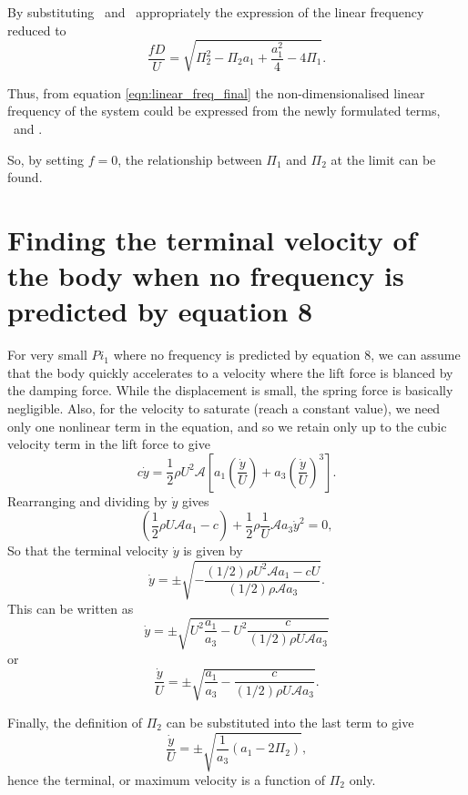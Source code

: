 By substituting \massstiff\ and \massdamp\ appropriately the expression of the linear frequency reduced to   
\begin{equation}
\label{eqn:linear_freq_final}
\frac{fD}{U} = \sqrt{\Pi_2^2 - \Pi_2a_1 + \frac{a_1^2}{4} - 4\Pi_1}.
\end{equation}

Thus, from equation \ref{eqn:linear_freq_final} the non-dimensionalised linear frequency of the system could be expressed from the newly formulated terms, \massstiff\ and \massdamp.



So, by setting $f=0$, the relationship between $\Pi_1$ and $\Pi_2$ at
the limit can be found.

\section{Finding the terminal velocity of the body when no frequency
	is predicted by equation 8}
	
	For very small $Pi_1$ where no frequency is predicted by equation 8,
	we can assume that the body quickly accelerates to a velocity where
	the lift force is blanced by the damping force. While the displacement
	is small, the spring force is basically negligible. Also, for the
	velocity to saturate (reach a constant value), we need only one
	nonlinear term in the equation, and so we retain only up to the cubic
	velocity term in the lift force to give
	\begin{equation}
	c\dot{y} = \frac{1}{2}\rho U^2\mathcal{A}\left[a_1\left(\frac{\dot{y}}{U}\right) + a_3\left(\frac{\dot{y}}{U}\right)^3\right].
	\end{equation}
	Rearranging and dividing by $\dot{y}$ gives
	\begin{equation}
	\left(\frac{1}{2}\rho U\mathcal{A}a_1 - c\right) + \frac{1}{2}\rho\frac{1}{U}\mathcal{A}a_3\dot{y}^2 = 0,
	\end{equation}
	So that the terminal velocity $\dot{y}$ is given by
	\begin{equation}
	\dot{y} = \pm\sqrt{-\frac{(1/2)\rho U^2\mathcal{A}a_1 - cU}{(1/2)\rho\mathcal{A}a_3}}.
	\end{equation}
	This can be written as
	\begin{equation}
	\dot{y} = \pm\sqrt{U^2\frac{a_1}{a_3} - U^2\frac{c}{(1/2)\rho U\mathcal{A}a_3}}
	\end{equation}
	or
	\begin{equation}
	\frac{\dot{y}}{U} = \pm\sqrt{\frac{a_1}{a_3} - \frac{c}{(1/2)\rho U\mathcal{A}a_3}}.
	\end{equation}
	
	Finally, the definition of $\Pi_2$ can be substituted into the last term to give
	\begin{equation}
	\frac{\dot{y}}{U} = \pm\sqrt{\frac{1}{a_3}(a_1 - 2\Pi_2)},
	\end{equation}
	hence the terminal, or maximum velocity is a function of $\Pi_2$ only.




